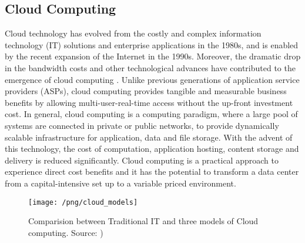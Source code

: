 \documentclass[../main.tex]{subfiles}
\begin{document}
\subsection{Cloud Computing}
\label{cloud}
	Cloud technology has evolved from the costly and complex information technology (IT)
solutions and enterprise applications in the 1980s, and is enabled by the recent expansion of the Internet in the 1990s. Moreover, the dramatic drop in the bandwidth costs and other technological advances have contributed to the emergence of cloud computing \cite{mell2011nist}. Unlike previous generations of application service providers (ASPs), cloud computing
provides tangible and measurable business benefits by allowing multi-user-real-time access without the up-front investment cost. In general, cloud computing is a computing paradigm, where a large pool of systems are connected in private or
public networks, to provide dynamically scalable infrastructure for application, data and file storage. With the advent of this technology, the cost of computation, application hosting, content storage and delivery is reduced significantly. Cloud computing is a practical approach to experience direct cost benefits and it has the potential to transform a data center from a capital-intensive set up to a variable priced environment.

\begin{figure}[!ht] 
   \centering
   \texttt{[image: /png/cloud\_models]}
  \caption{Comparision between Traditional IT and three models of Cloud computing. Source: \cite{david2018cloud})} 
  \label{fig_cloud_models} 
\end{figure}
\end{document}
